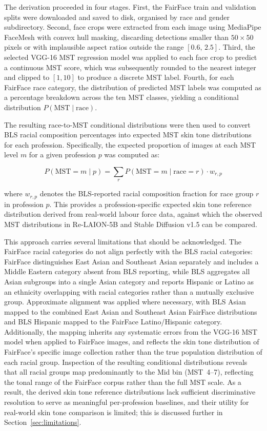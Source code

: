 The derivation proceeded in four stages. First, the FairFace train and validation splits
were downloaded and saved to disk, organised by race and gender subdirectory. Second,
face crops were extracted from each image using MediaPipe FaceMesh with convex hull
masking, discarding detections smaller than $50 \times 50$ pixels or with implausible
aspect ratios outside the range $[0.6,\, 2.5]$. Third, the selected VGG-16 MST
regression model was applied to each face crop to predict a continuous MST score, which
was subsequently rounded to the nearest integer and clipped to $[1, 10]$ to produce a
discrete MST label. Fourth, for each FairFace race category, the distribution of
predicted MST labels was computed as a percentage breakdown across the ten MST classes,
yielding a conditional distribution $P(\text{MST} \mid \text{race})$.

The resulting race-to-MST conditional distributions were then used to convert BLS racial
composition percentages into expected MST skin tone distributions for each profession.
Specifically, the expected proportion of images at each MST level $m$ for a given
profession $p$ was computed as:

\begin{equation}
	P(\text{MST} = m \mid p) = \sum_{r} P(\text{MST} = m \mid \text{race} = r)
	\cdot w_{r,p}
	\label{eq:mst_reference}
\end{equation}

\noindent where $w_{r,p}$ denotes the BLS-reported racial composition fraction for race
group $r$ in profession $p$. This provides a profession-specific expected skin tone
reference distribution derived from real-world labour force data, against which the
observed MST distributions in Re-LAION-5B and Stable Diffusion v1.5 can be compared.

This approach carries several limitations that should be acknowledged. The FairFace
racial categories do not align perfectly with the BLS racial categories: FairFace
distinguishes East Asian and Southeast Asian separately and includes a Middle Eastern
category absent from BLS reporting, while BLS aggregates all Asian subgroups into a
single Asian category and reports Hispanic or Latino as an ethnicity overlapping with
racial categories rather than a mutually exclusive group. Approximate alignment was
applied where necessary, with BLS Asian mapped to the combined East Asian and Southeast
Asian FairFace distributions and BLS Hispanic mapped to the FairFace Latino/Hispanic
category. Additionally, the mapping inherits any systematic errors from the VGG-16 MST
model when applied to FairFace images, and reflects the skin tone distribution of
FairFace's specific image collection rather than the true population distribution of
each racial group. Inspection of the resulting conditional distributions reveals that all
racial groups map predominantly to the Mid bin (MST~4--7), reflecting the tonal range of
the FairFace corpus rather than the full MST scale. As a result, the derived skin tone
reference distributions lack sufficient discriminative resolution to serve as meaningful
per-profession baselines, and their utility for real-world skin tone comparison is
limited; this is discussed further in Section~\ref{sec:limitations}.

